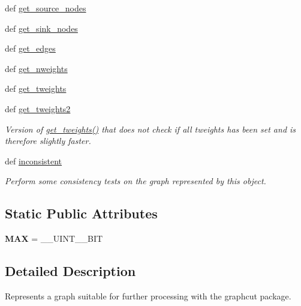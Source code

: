\begin{DoxyCompactItemize}
\item 
def \hyperlink{classmedpy_1_1graphcut_1_1graph_1_1Graph_a4c8dbbd92c6b0e5534869890810f0c78}{get\_\-source\_\-nodes}
\item 
def \hyperlink{classmedpy_1_1graphcut_1_1graph_1_1Graph_a988309a34486d834c65d87e83548b969}{get\_\-sink\_\-nodes}
\item 
def \hyperlink{classmedpy_1_1graphcut_1_1graph_1_1Graph_aabbf310726d5af9bbd79c6492f683c11}{get\_\-edges}
\item 
def \hyperlink{classmedpy_1_1graphcut_1_1graph_1_1Graph_a1090dadcdad71f1d629425c917e32ba5}{get\_\-nweights}
\item 
def \hyperlink{classmedpy_1_1graphcut_1_1graph_1_1Graph_a4b033a8067128c8a222f6c466f1b606f}{get\_\-tweights}
\item 
def \hyperlink{classmedpy_1_1graphcut_1_1graph_1_1Graph_a0441ff798c06ebf4cb860af7ccf37a36}{get\_\-tweights2}
\begin{DoxyCompactList}\small\item\em Version of  \hyperlink{classmedpy_1_1graphcut_1_1graph_1_1Graph_a4b033a8067128c8a222f6c466f1b606f}{get\_\-tweights()} that does not check if all tweights has been set and is therefore slightly faster. \end{DoxyCompactList}\item 
def \hyperlink{classmedpy_1_1graphcut_1_1graph_1_1Graph_a0fbe2b59f746e726f8bcf6c3111d7860}{inconsistent}
\begin{DoxyCompactList}\small\item\em Perform some consistency tests on the graph represented by this object. \end{DoxyCompactList}\end{DoxyCompactItemize}
\subsection*{Static Public Attributes}
\begin{DoxyCompactItemize}
\item 
\hypertarget{classmedpy_1_1graphcut_1_1graph_1_1Graph_aaed442199a4e04230982c1eb5cf809df}{
{\bfseries MAX} = \_\-\_\-UINT\_\_\-BIT}
\label{classmedpy_1_1graphcut_1_1graph_1_1Graph_aaed442199a4e04230982c1eb5cf809df}

\end{DoxyCompactItemize}


\subsection{Detailed Description}
Represents a graph suitable for further processing with the graphcut package. 

